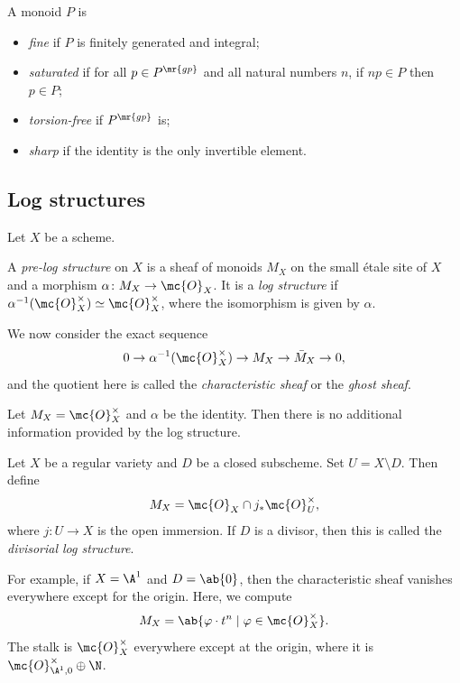 \begin{defn}
    A monoid \(P\) is 
    \begin{itemize}
        \item \textit{fine} if \(P\) is finitely generated and integral;
        \item \textit{saturated} if for all \(p \in P^{\mr{gp}}\) and all natural numbers \(n\), if \(np \in P\) then \(p \in P\);
        \item \textit{torsion-free} if \(P^{\mr{gp}}\) is;
        \item \textit{sharp} if the identity is the only invertible element.
    \end{itemize}
\end{defn}

\subsection{Log structures}%
\label{sub:Log structures}

Let \(X\) be a scheme.
\begin{defn}
    A \textit{pre-log structure} on \(X\) is a sheaf of monoids \(M_X\) on the small \'etale site of \(X\) and a morphism \(\alpha \colon M_X \to \mc{O}_X\). It is a \textit{log structure} if \(\alpha^{-1}(\mc{O}_X^{\times}) \simeq \mc{O}_X^{\times}\), where the isomorphism is given by \(\alpha\). 
\end{defn}

We now consider the exact sequence
\[ 0 \to \alpha^{-1}(\mc{O}_X^{\times}) \to M_X \to \bar{M}_X \to 0, \]
and the quotient here is called the \textit{characteristic sheaf} or the \textit{ghost sheaf}.

\begin{exm}
    Let \(M_X = \mc{O}_X^{\times}\)  and \(\alpha\) be the identity. Then there is no additional information provided by the log structure.
\end{exm}

\begin{exm}
    Let \(X\) be a regular variety and \(D\) be a closed subscheme. Set \(U = X \setminus D\). Then define
    \[ M_X = \mc{O}_X \cap j_* \mc{O}_U^{\times}, \]
    where \(j \colon U \to X\) is the open immersion. If \(D\) is a divisor, then this is called the \textit{divisorial log structure}.

    For example, if \(X = \A^1\) and \(D = \ab\{0\}\), then the characteristic sheaf vanishes everywhere except for the origin. Here, we compute
    \[ M_X = \ab\{ \varphi \cdot t^n \mid \varphi \in \mc{O}_X^{\times} \}. \]
    The stalk is \(\mc{O}_X^{\times}\) everywhere except at the origin, where it is \(\mc{O}_{\A^1, 0}^{\times} \oplus \N\).
\end{exm}

